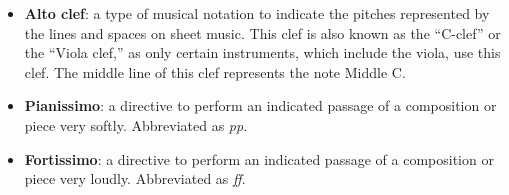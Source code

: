 \begin{itemize}
    \item {\textbf{Alto clef}: a type of musical notation to indicate the pitches represented by the lines and spaces on sheet music. This clef is also known as the ``C-clef'' or the ``Viola clef,'' as only certain instruments, which include the viola, use this clef. The middle line of this clef represents the note Middle C.}
    \item {\textbf{Pianissimo}: a directive to perform an indicated passage of a composition or piece very softly. Abbreviated as \textit{pp}.}
    \item {\textbf{Fortissimo}: a directive to perform an indicated passage of a composition or piece very loudly. Abbreviated as \textit{ff}.}
\end{itemize}